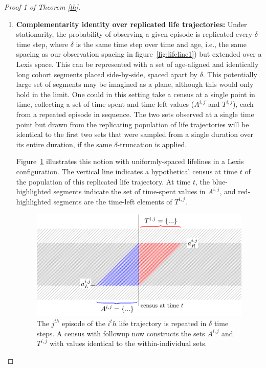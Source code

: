 \documentclass[12pt,oneside,a4paper]{article}
\theoremstyle{definition}
\newcommand{\vb}[1]{\texttt{#1}}
\begin{document}
\begin{proof}[Proof 1 of Theorem \ref{th}]
\begin{enumerate}
For example, from the  life trajectory in Tab.~\ref{tab:traj}, \vb{HSSH}, sickness might be the state of interest, in which case \vb{SS} becomes the episode of interest in this trajectory. If each time step is a year, $\delta = 1$, then we have $A^{21,1} = \{ 0,1,2 \}$ and $T^{21,1} = \{ 2,1,0 \}$: Where order does not matter, these are two equal sets.

\FloatBarrier
\item{\textbf{Complementarity identity over replicated life trajectories:}} Under stationarity, the probability of observing a given episode is replicated every $\delta$ time step, where $\delta$ is the same time step over time and age, i.e., the same spacing as our observation spacing in figure~\ref{fig:lifeline1}) but extended over a
Lexis space. This can be represented with a set of age-aligned and identically long cohort segments placed side-by-side, spaced apart by $\delta$.
This potentially large set of segments may be imagined as a plane, although this
would only hold in the limit.
One could in this setting take a census at a single point in time, collecting a set of
time spent and time left values ($A^{i,j}$ and $T^{i,j}$), each from a repeated episode in
sequence.
The two sets observed at a single time point but drawn from the replicating population of life trajectories will be identical to the first two sets that were sampled from
a single duration over its entire duration, if the same $\delta$-truncation is applied.

Figure~\ref{fig:clones} illustrates this notion with uniformly-spaced lifelines
in a Lexis configuration. The vertical line indicates a hypothetical census at time $t$ of
the population of this replicated life trajectory. At time $t$, the blue-highlighted segments indicate
the set of time-spent values in $A^{i,j}$, and red-highlighted segments are the
time-left elements of $T^{i,j}$. 

 \begin{figure}[h!]
\centering
\caption{The $j^{th}$ episode of the $i^th$ life trajectory is repeated in $\delta$ time steps. A
census with followup now constructs the sets $A^{i,j}$ and $T^{i,j}$ with values
identical to the within-individual sets.}
\label{fig:clones}
\includegraphics[scale=.8]{Figures/lifelinerepeated.pdf}
\end{figure}


\end{enumerate}
\end{proof}
\end{document}

